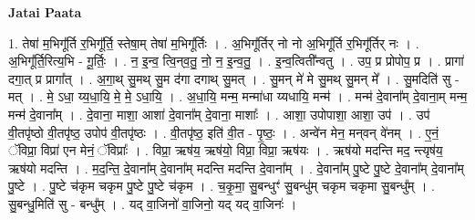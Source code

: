 \documentclass[17pt]{extarticle}
\begin{document}
\textbf{Jatai Paata} \newline

1. तेषा॑ म॒भिगू᳚र्ति र॒भिगू᳚र्ति॒ स्तेषा॒म् तेषा॑ म॒भिगू᳚र्तिः । . अ॒भिगू᳚र्तिर् नो नो अ॒भिगू᳚र्ति र॒भिगू᳚र्तिर् नः । . अ॒भिगू᳚र्ति॒रित्य॒भि - गू॒र्तिः॒ । . न॒ इ॒न्व॒ त्वि॒न्‌व॒तु॒ नो॒ न॒ इ॒न्व॒तु॒ । . इ॒न्व॒त्विती᳚न्वतु । . उप॒ प्र प्रोपोप॒ प्र । . प्रागा॑ दगा॒त् प्र प्रागा᳚त् । . अ॒गा॒थ् सु॒मथ् सु॒म द॑गा दगाथ् सु॒मत् । . सु॒मन् मे॑ मे सु॒मथ् सु॒मन् मे᳚ । . सु॒मदिति॑ सु - मत् । . मे॒ ऽधा॒ य्य॒धा॒यि॒ मे॒ मे॒ ऽधा॒यि॒ । . अ॒धा॒यि॒ मन्म॒ मन्मा॑धा य्यधायि॒ मन्म॑ । . मन्म॑ दे॒वाना᳚म् दे॒वाना॒म् मन्म॒ मन्म॑ दे॒वाना᳚म् । . दे॒वाना॒ माशा॒ आशा॑ दे॒वाना᳚म् दे॒वाना॒ माशाः᳚ । . आशा॒ उपोपाशा॒ आशा॒ उप॑ । . उप॑ वी॒तपृ॑ष्ठो वी॒तपृ॑ष्ठ॒ उपोप॑ वी॒तपृ॑ष्ठः । . वी॒तपृ॑ष्ठ॒ इति॑ वी॒त - पृ॒ष्ठः॒ । . अन्वे॑न मेन॒ मन्‌वन्‌ वे॑नम् । . ए॒नं॒ ॅविप्रा॒ विप्रा॑ एन मेनं॒ ॅविप्राः᳚ । . विप्रा॒ ऋष॑य॒ ऋष॑यो॒ विप्रा॒ विप्रा॒ ऋष॑यः । . ऋष॑यो मदन्ति मद॒ न्त्यृष॑य॒ ऋष॑यो मदन्ति । . म॒द॒न्ति॒ दे॒वाना᳚म् दे॒वाना᳚म् मदन्ति मदन्ति दे॒वाना᳚म् । . दे॒वाना᳚म् पु॒ष्टे पु॒ष्टे दे॒वाना᳚म् दे॒वाना᳚म् पु॒ष्टे । . पु॒ष्टे च॑कृम चकृम पु॒ष्टे पु॒ष्टे च॑कृम । . च॒कृ॒मा॒ सु॒बन्धुꣳ॑ सु॒बन्धु॑म् चकृम चकृमा सु॒बन्धु᳚म् । . सु॒बन्धु॒मिति॑ सु - बन्धु᳚म् । . यद् वा॒जिनो॑ वा॒जिनो॒ यद् यद् वा॒जिनः॑ । \newline
\end{document}
